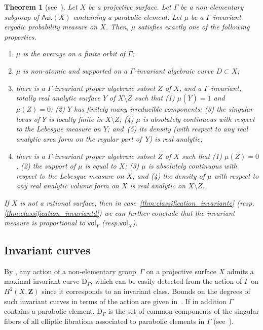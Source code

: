 \documentclass[11pt]{article}
\newcommand{\resp}{resp.\xspace}
\newenvironment{enumeratea}
{\bgroup\def\theenumi{\alph{enumi}}\begin{enumerate}}
{\end{enumerate}\egroup}
\def\Z{\mathbf{Z}}
\newcommand\Aut{\mathsf{Aut}}
\newcommand{\vol}{{\mathsf{vol}}}
\theoremstyle{plain}
\newtheorem{thm}{Theorem}[section]
\theoremstyle{definition}
\numberwithin{equation}{section}
\begin{document}
\begin{thm}[{see~\cite[Th.\,A]{invariant}}]\label{thm:classification_invariant}
Let $X$ be a projective surface. Let $\Gamma$ be a non-elementary subgroup of $\Aut(X)$ containing a parabolic element. Let $\mu$ be a $\Gamma$-invariant ergodic probability measure on $X$.
Then, $\mu$ satisfies exactly one of the following properties.

\begin{enumeratea}
\item\label{thm:classification_invarianta} $\mu$ is the average on a finite orbit of $\Gamma$;
\item\label{thm:classification_invariantb} $\mu$ is non-atomic and supported on a $\Gamma$-invariant algebraic curve $D\subset X$;
\item\label{thm:classification_invariantc} there is a $\Gamma$-invariant proper algebraic subset $Z$ of $X$, and a $\Gamma$-invariant,
totally real analytic surface $Y$ of
$X\setminus Z$ such that {\em {(1)}} $\mu(\overline{Y}) = 1$ and $\mu(Z)=0$; {\em {(2)}} $Y$ has finitely many irreducible components;
{\em {(3)}} the singular locus of $Y$ is locally finite in $X\setminus Z$;
{\em {(4)}} $\mu$
is absolutely continuous with respect to the Lebesgue measure on $Y$; and~{\em {(5)}} its density (with respect to any real analytic area form on the regular part of~$Y$)
is real analytic;
\item\label{thm:classification_invariantd} there is a $\Gamma$-invariant proper algebraic subset $Z$ of $X$ such that {\em {(1)}} $\mu(Z)=0$, {\em {(2)}} the support of $\mu$ is equal to $X$; {\em {(3)}} $\mu$ is absolutely continuous with respect to the Lebesgue measure on $X$; and {\em {(4)}} the density of $\mu$ with respect to any real analytic
volume form on $X$ is real analytic on $X\setminus Z$.
\end{enumeratea}
If $X$ is not a rational surface, then in case~\eqref{thm:classification_invariantc} (\resp \eqref{thm:classification_invariantd}) we can further conclude that the invariant measure is proportional to $\vol_Y$ (\resp $\vol_X$).
\end{thm}

\subsection{Invariant curves}\label{subs:invariant_curves}
By \cite[Lem.\,2.12]{stiffness}, any action of a non-elementary group~$\Gamma$ on a
projective surface $X$ admits a maximal invariant curve $\mathrm D_\Gamma$,
which can be easily detected from the action of $\Gamma$ on $H^2(X, \Z)$
since it corresponds to an invariant class. Bounds on the degrees of such invariant curves in terms of the action are given in~\hbox{\cite[\S 3]{finite_orbits}}. If in addition $\Gamma$
contains a parabolic element, $\mathrm D_\Gamma$ is the set of common components of the singular fibers of all elliptic fibrations associated to
parabolic elements in $\Gamma$ (see~\cite[\S 4.1]{invariant}).
\end{document}
